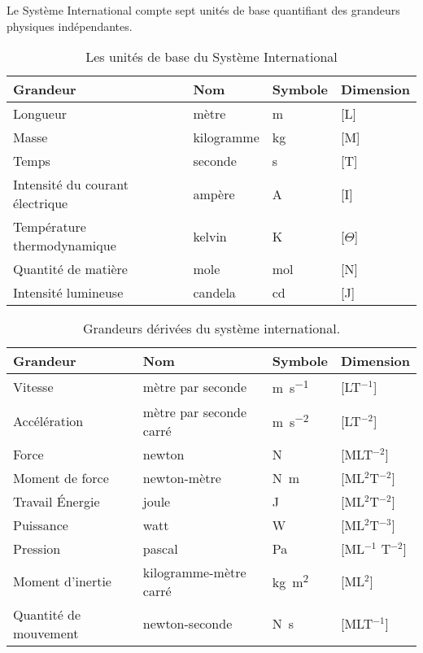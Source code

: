 Le Système International compte sept unités de base quantifiant des grandeurs 
physiques indépendantes.
\begin{table}[!h]
    \centering
    \begin{tabular}{@{}P{6cm}P{2.5cm}P{2.5cm}P{2.5cm}@{}}
        \toprule
        Grandeur & Nom & Symbole & Dimension \\
        \midrule
        Longueur & mètre & \si{\meter} & [L] \\
        Masse & kilogramme & \si{\kilogram} & [M] \\
        Temps & seconde & \si{\second} & [T] \\
        Intensité du courant électrique & ampère & \si{\ampere} & [I] \\
        Température thermodynamique & kelvin & \si{\kelvin} & [$\Theta$] \\
        Quantité de matière & mole & \si{\mole} & [N] \\
        Intensité lumineuse & candela & \si{\candela} & [J] \\
        \bottomrule
    \end{tabular}
    \caption{Les unités de base du Système International}
\end{table}
\begin{table}[!htb]
    \centering
    \begin{tabular}{@{}P{5.5cm}P{4cm}P{1.5cm}P{2cm}@{}}
    \toprule
    Grandeur & Nom & Symbole & Dimension \\
    \midrule
Vitesse          & mètre par seconde & \si{\meter\per\second}&[LT$^{-1}$]     \\
Accélération     & mètre par 
                    seconde carré    & \si{\meter\per
                                            \second\squared} &[LT$^{-2}$]     \\
Force            & newton            & \si{\newton}          &[MLT$^{-2}$]    \\
Moment de force  & newton-mètre      & \si{\newton\meter}    &[ML$^2$T$^{-2}$]\\
Travail \'Energie& joule             & \si{\joule}           &[ML$^2$T$^{-2}$]\\
Puissance        & watt              & \si{\watt}            &[ML$^2$T$^{-3}$]\\
Pression         & pascal            & \si{\pascal}          &[ML$^{-1}$
                                                                  T$^{-2}$]   \\
Moment d'inertie & kilogramme-mètre 
                    carré            & \si{\kilogram
                                            \meter\squared}   &[ML$^2$]       \\
Quantité 
de mouvement     & newton-seconde    & \si{\newton\second}   &[MLT$^{-1}$]    \\
    \bottomrule
    \end{tabular}
    \caption{Grandeurs dérivées du système international.}
\end{table}
